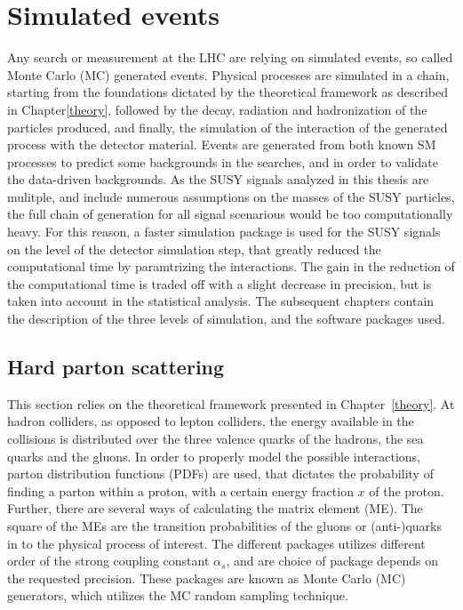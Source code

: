 \section{Simulated events}
Any search or measurement at the LHC are relying on simulated events, so called Monte Carlo (MC) generated events. 
Physical processes are simulated in a chain, starting from the foundations dictated by the theoretical framework as described in Chapter\ref{theory}, followed by the decay, radiation and hadronization of the particles produced, and finally, the simulation of the interaction of the generated process with the detector material. 
Events are generated from both known SM processes to predict some backgrounds in the searches, and in order to validate the data-driven backgrounds. 
As the SUSY signals analyzed in this thesis are mulitple, and include numerous assumptions on the masses of the SUSY particles, the full chain of generation for all signal scenarious would be too computationally heavy. 
For this reason, a faster simulation package is used for the SUSY signals on the level of the detector simulation step, that greatly reduced the computational time by paramtrizing the interactions. 
The gain in the reduction of the computational time is traded off with a slight decrease in precision, but is taken into account in the statistical analysis. 
The subsequent chapters contain the description of the three levels of simulation, and the software packages used. 
\subsection{Hard parton scattering}
This section relies on the theoretical framework presented in Chapter~\ref{theory}. 
At hadron colliders, as opposed to lepton colliders, the energy available in the collisions is distributed over the three valence quarks of the hadrons, the sea quarks and the gluons. 
In order to properly model the possible interactions, parton distribution functions (PDFs) are used, that dictates the probability of finding a parton within a proton, with a certain energy fraction $x$ of the proton. 
Further, there are several ways of calculating the matrix element (ME). The square of the MEs are the transition probabilities of the gluons or (anti-)quarks in to the physical process of interest.
The different packages utilizes different order of the strong coupling constant $\alpha_{s}$, and are choice of package depends on the requested precision.
These packages are known as Monte Carlo (MC) generators, which utilizes the MC random sampling technique.  
